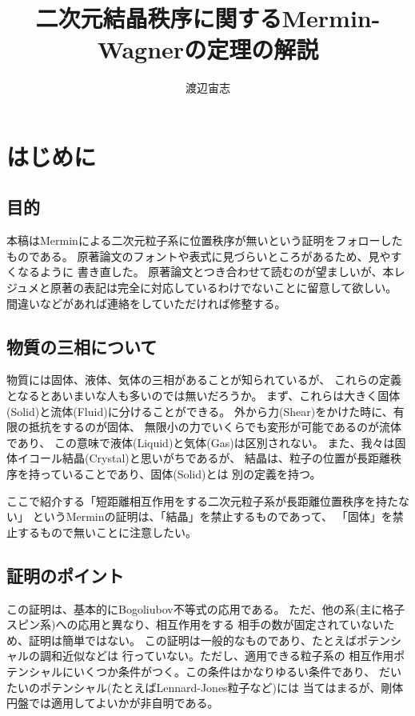 \documentclass{jarticle}
\title{二次元結晶秩序に関するMermin-Wagnerの定理の解説}
\author{渡辺宙志}
\affiliation{慶応義塾大学理工学部物理情報工学科}
\begin{document}
\maketitle

\hrulefill
\tableofcontents
\hrulefill

\section{はじめに}

\subsection{目的}

本稿はMerminによる二次元粒子系に位置秩序が無いという証明\cite{Mermin}をフォローしたものである。
原著論文のフォントや表式に見づらいところがあるため、見やすくなるように
書き直した。
原著論文とつき合わせて読むのが望ましいが、本レジュメと原著の表記は完全に対応しているわけでないことに留意して欲しい。
間違いなどがあれば連絡をしていただければ修整する。

\subsection{物質の三相について}

物質には固体、液体、気体の三相があることが知られているが、
これらの定義となるとあいまいな人も多いのでは無いだろうか。
まず、これらは大きく固体(Solid)と流体(Fluid)に分けることができる。
外から力(Shear)をかけた時に、有限の抵抗をするのが固体、
無限小の力でいくらでも変形が可能であるのが流体であり、
この意味で液体(Liquid)と気体(Gas)は区別されない。
また、我々は固体イコール結晶(Crystal)と思いがちであるが、
結晶は、粒子の位置が長距離秩序を持っていることであり、固体(Solid)とは
別の定義を持つ。

ここで紹介する「短距離相互作用をする二次元粒子系が長距離位置秩序を持たない」
というMerminの証明は、「結晶」を禁止するものであって、
「固体」を禁止するもので無いことに注意したい。


\subsection{証明のポイント}

この証明は、基本的にBogoliubov不等式の応用である。
ただ、他の系(主に格子スピン系)への応用と異なり、相互作用をする
相手の数が固定されていないため、証明は簡単ではない。
この証明は一般的なものであり、たとえばポテンシャルの調和近似などは
行っていない。ただし、適用できる粒子系の
相互作用ポテンシャルにいくつか条件がつく。この条件はかなりゆるい条件であり、
だいたいのポテンシャル(たとえばLennard-Jones粒子など)には
当てはまるが、剛体円盤では適用してよいかが非自明である。
\end{document}
